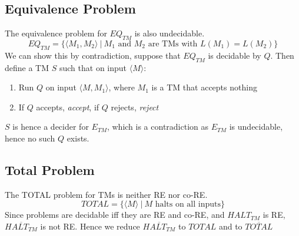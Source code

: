 \documentclass{article}
\newcommand{\encode}[1]{\langle #1 \rangle}
\begin{document}
    \subsection{Equivalence Problem}
        The equivalence problem for $EQ_{TM}$ is also undecidable. 
        \[ EQ_{TM} = \{ \encode{M_1, M_2} \ | \ \text{$M_1$ and $M_2$ are TMs with $L(M_1) = L(M_2)$} \} \]
        We can show this by contradiction, suppose that $EQ_{TM}$ is decidable by $Q$. Then define a TM $S$ such that on input $\encode{M}$:
        \begin{enumerate}
            \item Run $Q$ on input $\encode{M, M_1}$, where $M_1$ is a TM that accepts nothing
            \item If $Q$ accepts, \textit{accept}, if $Q$ rejects, \textit{reject} 
        \end{enumerate}
        $S$ is hence a decider for $E_{TM}$, which is a contradiction as $E_{TM}$ is undecidable, hence no such $Q$ exists.
    \subsection{Total Problem}
        The TOTAL problem for TMs is neither RE nor co-RE. 
        \[ TOTAL = \{ \encode{M} \ | \ \text{$M$ halts on all inputs} \} \]
        Since problems are decidable iff they are RE and co-RE, and $HALT_{TM}$ is RE, $\overline{HALT_{TM}}$ is not RE. Hence we reduce $\overline{HALT_{TM}}$ to $TOTAL$ and to $\overline{TOTAL}$
\end{document}
